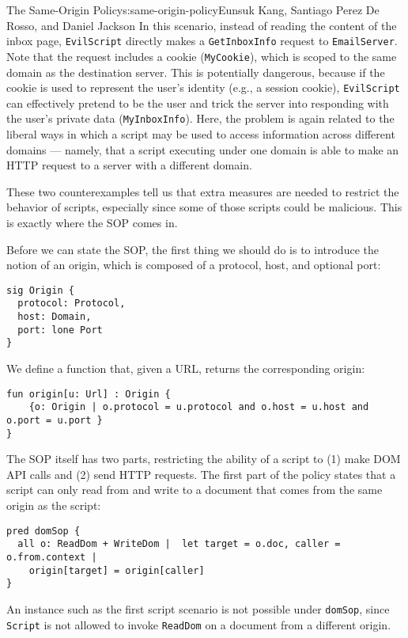 \begin{aosachapter}{The Same-Origin Policy}{s:same-origin-policy}{Eunsuk Kang, Santiago Perez De Rosso, and Daniel Jackson}
In this scenario, instead of reading the content of the inbox page,
\texttt{EvilScript} directly makes a \texttt{GetInboxInfo} request to
\texttt{EmailServer}. Note that the request includes a cookie
(\texttt{MyCookie}), which is scoped to the same domain as the
destination server. This is potentially dangerous, because if the cookie
is used to represent the user's identity (e.g., a session cookie),
\texttt{EvilScript} can effectively pretend to be the user and trick the
server into responding with the user's private data
(\texttt{MyInboxInfo}). Here, the problem is again related to the
liberal ways in which a script may be used to access information across
different domains --- namely, that a script executing under one domain
is able to make an HTTP request to a server with a different domain.

These two counterexamples tell us that extra measures are needed to
restrict the behavior of scripts, especially since some of those scripts
could be malicious. This is exactly where the SOP comes in.

\label{same-origin-policy}

Before we can state the SOP, the first thing we should do is to
introduce the notion of an origin, which is composed of a protocol,
host, and optional port:

\begin{verbatim}
sig Origin {
  protocol: Protocol,
  host: Domain,
  port: lone Port
}
\end{verbatim}

We define a function that, given a URL, returns the corresponding
origin:

\begin{verbatim}
fun origin[u: Url] : Origin {
    {o: Origin | o.protocol = u.protocol and o.host = u.host and o.port = u.port }
}
\end{verbatim}

The SOP itself has two parts, restricting the ability of a script to (1)
make DOM API calls and (2) send HTTP requests. The first part of the
policy states that a script can only read from and write to a document
that comes from the same origin as the script:

\begin{verbatim}
pred domSop {
  all o: ReadDom + WriteDom |  let target = o.doc, caller = o.from.context |
    origin[target] = origin[caller] 
}
\end{verbatim}

An instance such as the first script scenario is not possible under
\texttt{domSop}, since \texttt{Script} is not allowed to invoke
\texttt{ReadDom} on a document from a different origin.


\end{aosachapter}
